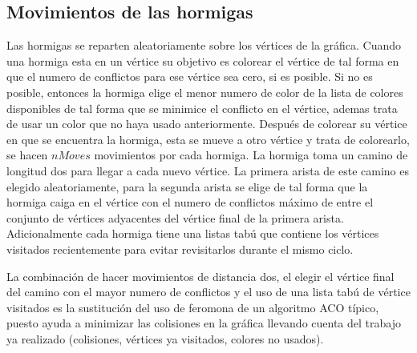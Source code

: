 \documentclass{article}
\begin{document}
\subsection{Movimientos de las hormigas}

Las hormigas se reparten aleatoriamente sobre los vértices de la gráfica. Cuando una hormiga esta en un vértice su objetivo es colorear el vértice de tal forma en que el numero de conflictos para ese vértice sea cero, si es posible. Si no es posible, entonces la hormiga elige el menor numero de color de la lista de colores disponibles de tal forma que se minimice el conflicto en el vértice, ademas trata de usar un color que no haya usado anteriormente. Después de colorear su vértice en que se encuentra la hormiga, esta se mueve a otro vértice y trata de colorearlo, se hacen $nMoves$ movimientos por cada hormiga. La hormiga toma un camino de longitud dos para llegar a cada nuevo vértice. La primera arista de este camino es elegido aleatoriamente, para la segunda arista se elige de tal forma que la hormiga caiga en el vértice con el numero de conflictos máximo de entre el conjunto de vértices adyacentes del vértice final de la primera arista. Adicionalmente cada hormiga tiene una listas tabú que contiene los vértices visitados recientemente para evitar revisitarlos durante el mismo ciclo.

La combinación de hacer movimientos de distancia dos, el elegir el vértice final del camino con el mayor numero de conflictos y el uso de una lista tabú de vértice visitados es la sustitución del uso de feromona de un algoritmo {ACO} típico, puesto ayuda a minimizar las colisiones en la gráfica llevando cuenta del trabajo ya realizado (colisiones, vértices ya visitados, colores no usados).
\end{document}
